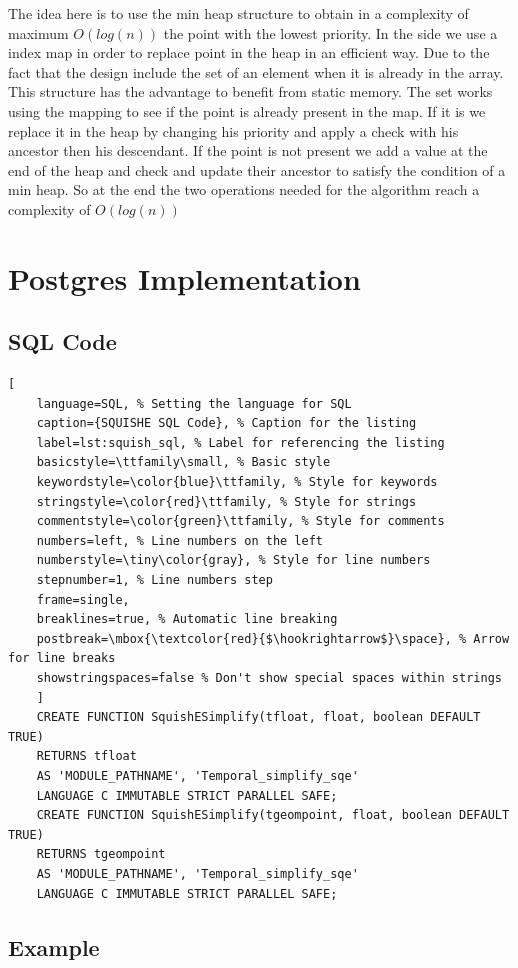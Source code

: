 \documentclass[twoside,12pt, a4paper]{report}
\begin{document}
The idea here is to use the min heap structure to obtain in a complexity of maximum $O(log(n))$  the point with the lowest priority. In the side we use a index map in order to replace point in the heap in an efficient way. Due to the fact that the design include the set of an element when it is already in the array. This structure has the advantage to benefit from static memory. The set works using the mapping to see if the point is already present in the map. If it is we replace it in the heap by changing his priority and apply a check with his ancestor then his descendant. If the point is not present we add a value at the end of the heap and check and update their ancestor to satisfy the condition of a min heap. So at the end the two operations needed for the algorithm reach a complexity of $O(log(n))$ 

\section{Postgres Implementation}
\subsection{SQL Code}
\begin{lstlisting}[
	language=SQL, % Setting the language for SQL
	caption={SQUISHE SQL Code}, % Caption for the listing
	label=lst:squish_sql, % Label for referencing the listing
	basicstyle=\ttfamily\small, % Basic style
	keywordstyle=\color{blue}\ttfamily, % Style for keywords
	stringstyle=\color{red}\ttfamily, % Style for strings
	commentstyle=\color{green}\ttfamily, % Style for comments
	numbers=left, % Line numbers on the left
	numberstyle=\tiny\color{gray}, % Style for line numbers
	stepnumber=1, % Line numbers step
	frame=single,
	breaklines=true, % Automatic line breaking
	postbreak=\mbox{\textcolor{red}{$\hookrightarrow$}\space}, % Arrow for line breaks
	showstringspaces=false % Don't show special spaces within strings
	]
	CREATE FUNCTION SquishESimplify(tfloat, float, boolean DEFAULT TRUE)
	RETURNS tfloat
	AS 'MODULE_PATHNAME', 'Temporal_simplify_sqe'
	LANGUAGE C IMMUTABLE STRICT PARALLEL SAFE;
	CREATE FUNCTION SquishESimplify(tgeompoint, float, boolean DEFAULT TRUE)
	RETURNS tgeompoint
	AS 'MODULE_PATHNAME', 'Temporal_simplify_sqe'
	LANGUAGE C IMMUTABLE STRICT PARALLEL SAFE;
\end{lstlisting}

\subsection{Example}
\end{document}
